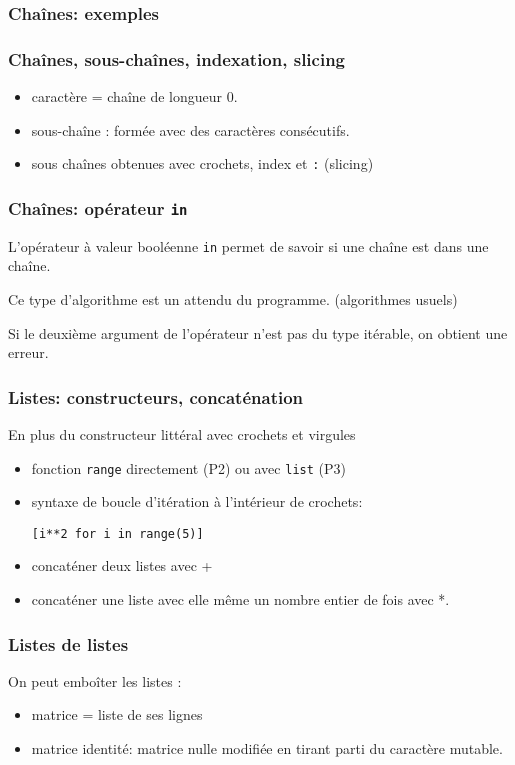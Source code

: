 \begin{frame}
  \frametitle{Chaînes: exemples}

\end{frame}

\begin{frame}
  \frametitle{Chaînes, sous-chaînes, indexation, slicing}
\begin{itemize}
  \item caractère = chaîne de longueur 0.
  \item sous-chaîne : formée avec des caractères consécutifs.
  \item sous chaînes obtenues avec crochets, index et \texttt{:} (slicing)
\end{itemize}

\end{frame}

\begin{frame}
  \frametitle{Chaînes: opérateur \texttt{in}}
  L'opérateur à valeur booléenne \texttt{in} permet de savoir si une chaîne est dans une chaîne.
  
  Ce type d'algorithme  est un attendu du programme. (algorithmes usuels)
  
  Si le deuxième argument de l'opérateur n'est pas du type itérable, on obtient une erreur.
\end{frame}

\begin{frame}
  \frametitle{Listes: constructeurs, concaténation}
  En plus du constructeur littéral avec crochets et virgules
  \begin{itemize}
    \item fonction \texttt{range} directement (P2) ou avec \texttt{list} (P3)
    \item syntaxe de boucle d'itération à l'intérieur de crochets:
      \begin{center}
        \texttt{[i**2 for i in range(5)]}
      \end{center}
    \item concaténer deux listes avec +
    \item concaténer une liste avec elle même un nombre entier de fois avec *.
  \end{itemize}
\end{frame}

\begin{frame}
  \frametitle{Listes de listes}
  On peut emboîter les listes :
  \begin{itemize}
    \item matrice = liste de ses lignes
    \item matrice identité: matrice nulle modifiée en tirant parti du caractère mutable.
  \end{itemize}
  
\end{frame}

